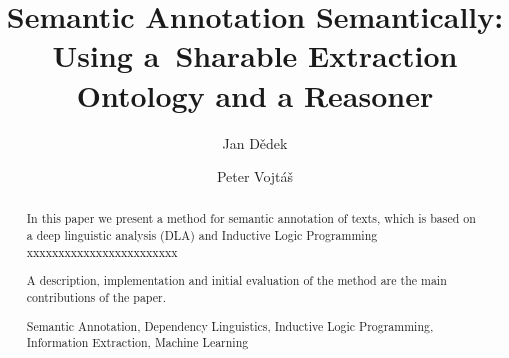 \documentclass[runningheads,a4paper]{llncs}
\newcommand{\keywords}[1]{\par\addvspace\baselineskip
\noindent\keywordname\enspace\ignorespaces#1}
\begin{document}
\mainmatter  %

\title{Semantic Annotation Semantically: Using a~Sharable Extraction Ontology and a Reasoner}


%
%
\author{Jan D\v{e}dek \and Peter Vojt\'{a}\v{s}}
%


%
%

\maketitle


\begin{abstract}
In this paper we present a method for semantic annotation of texts, which is based on a deep linguistic analysis (DLA) and Inductive Logic Programming xxxxxxxxxxxxxxxxxxxxxxxx

A description, implementation and initial evaluation of the method are the main contributions of the paper.
\keywords{Semantic Annotation, Dependency Linguistics, Inductive Logic Programming, Information Extraction, Machine Learning}
\end{abstract}
\end{document}
